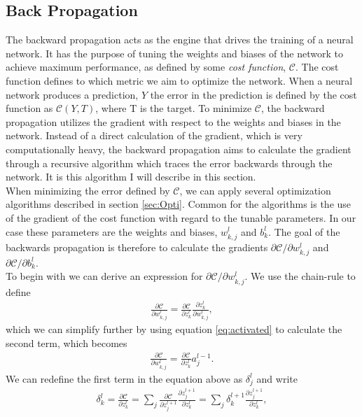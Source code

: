 \subsection{Back Propagation}\label{subsec:BP}
The backward propagation acts as the engine that drives the training of a neural network. It has the purpose
of tuning the weights and biases of the network to achieve maximum performance, as defined by some 
\emph{cost function}, $\mathcal{C}$. The cost function defines to which metric we aim to optimize the network. 
When a neural network produces a prediction, $Y$ the error in the prediction
is defined by the cost function as $\mathcal{C}\left(Y, T\right)$, where T is the target. To minimize $\mathcal{C}$, the 
backward propagation utilizes the gradient with respect to the weights and biases in the network. Instead of a
direct calculation of the gradient, which is very computationally heavy, the backward propagation 
aims to calculate the gradient through a recursive algorithm which traces the error backwards through the network. It is 
this algorithm I will describe in this section.
\\
\newline
When minimizing the error defined by $\mathcal{C}$, we can apply several optimization algorithms described in 
section \ref{sec:Opti}. Common for the algorithms is the use of the gradient of the cost function with regard to 
the tunable parameters. In our case these parameters are the weights and biases, $w_{k,j}^l$ and $b^l_k$. The goal of 
the backwards propagation is therefore to calculate the gradients $\partial \mathcal{C}/\partial w_{k,j}^l$ and
$\partial \mathcal{C}/\partial b^l_k$. 
\\
\newline
To begin with we can derive an expression for $\partial \mathcal{C}/\partial w_{k,j}^l$. We use the chain-rule to define 
\begin{align*}
    \frac{\partial \mathcal{C}}{\partial w_{k,j}^l} = \frac{\partial \mathcal{C}}{\partial z^l_k} \frac{\partial z^l_k}{\partial w_{k,j}^l},
\end{align*}
which we can simplify further by using equation \ref{eq:activated} to calculate the second term, which becomes
\begin{align*}
    \frac{\partial \mathcal{C}}{\partial w_{k,j}^l} = \frac{\partial \mathcal{C}}{\partial z^l_k} a^{l-1}_j.
\end{align*}
We can redefine the first term in the equation above as $\delta_j^l$ and write
\begin{align*}
    \delta_k^l = \frac{\partial \mathcal{C}}{\partial z^l_k}
               = \sum_j \frac{\partial \mathcal{C}}{\partial z^{l+1}_j}\frac{\partial z_j^{l+1}}{\partial z^l_k}  
               = \sum_j \delta_k^{l+1}\frac{\partial z_j^{l+1}}{\partial z^l_k},
\end{align*}
